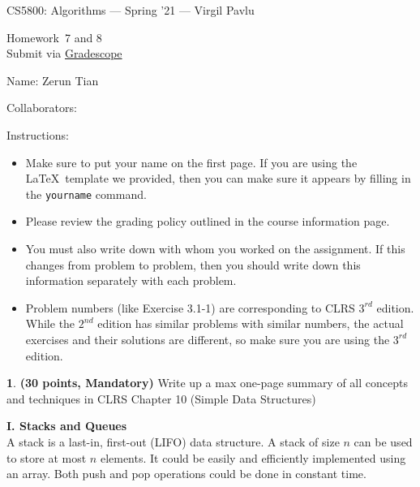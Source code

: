 \documentclass[11pt]{article}
\newcommand{\yourname}{Zerun Tian}
\newcommand{\yourcollaborators}{}
\theoremstyle{definition}
\newcommand{\instructor}{Virgil Pavlu}
\newcommand{\hwnum}{7 and 8}
\theoremstyle{theorem}
\newtheorem{prob}{}
\newcommand{\solution}{\medskip\noindent{\color{DarkBlue}\textbf{Solution:}}}
\begin{document}
{\Large 
\begin{center}{CS5800: Algorithms} --- Spring '21 --- \instructor \end{center}}
{\large
\vspace{10pt}
\noindent Homework~\hwnum \vspace{2pt}\\
Submit via \href{https://www.gradescope.com/courses/232127}{Gradescope}}

\bigskip
{\large \noindent Name: \yourname }

{\large \noindent Collaborators: \yourcollaborators}

\vspace{15pt}

{\large \noindent Instructions:}

\begin{itemize}

\item Make sure to put your name on the first page.  If you are using the \LaTeX~template we provided, then you can make sure it appears by filling in the \texttt{yourname} command.

\item Please review the grading policy outlined in the course information page.

\item You must also write down with whom you worked on the assignment.  If this changes from problem to problem, then you should write down this information separately with each problem.

\item Problem numbers (like Exercise 3.1-1) are corresponding to CLRS $3^{rd}$ edition.  While the  $2^{nd}$ edition  has  similar  problems  with  similar  numbers,  the  actual  exercises  and their solutions are different, so make sure you are using the $3^{rd}$ edition.

\end{itemize}

\newpage
\begin{prob} \textbf{(30 points, Mandatory)} Write up a max one-page summary of all concepts and techniques in CLRS Chapter 10 (Simple Data Structures)
\end{prob}

\solution

\textbf{I. Stacks and Queues} \\
A stack is a last-in, first-out (LIFO) data structure. A stack of size $n$ can be used to store at most $n$ elements. It could be easily and efficiently implemented using an array. Both push and pop operations could be done in constant time.
\end{document}
